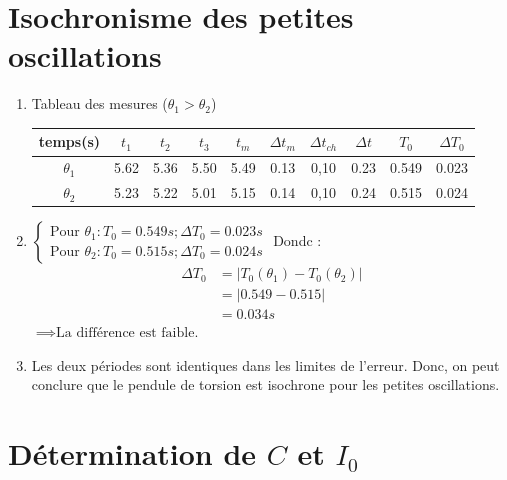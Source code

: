 \documentclass[a4paper,12pt]{article}
\begin{document}
\section{Isochronisme des petites oscillations}
\begin{enumerate}
    \item Tableau des mesures ($\theta_1 > \theta_2$) 
\begin{table}[H]
    \centering
    \renewcommand{\arraystretch}{1.5}
    \begin{tabular}{|c|c|c|c|c|c|c|c|c|c|}
    \hline
    temps(s) & $t_1$ & $t_2$ & $t_3$ & $t_m$ & $\Delta t_m$ & $\Delta t_{ch}$ & $\Delta t$ & $T_0$ & $\Delta T_0$ \\
    \hline
    $\theta_1$ & 5.62 & 5.36 & 5.50 & 5.49 & 0.13 & 0,10 & 0.23 & 0.549 & 0.023 \\
    \hline
    $\theta_2$ & 5.23 & 5.22 & 5.01 & 5.15 & 0.14 & 0,10 & 0.24 & 0.515 & 0.024 \\
    \hline
    \end{tabular}
\end{table}

    \item$ 
    \begin{cases}
        \text{Pour } \theta_1: T_0 = 0.549s ; \Delta T_0 =0.023s \\
        \text{Pour } \theta_2: T_0 = 0.515s ; \Delta T_0 =0.024s
    \end{cases}
    $
    Dondc : 
    \begin{align*}
        \Delta T_0 & = |T_0(\theta_1) - T_0(\theta_2)| \\
        & = |0.549 - 0.515| \\
        & = 0.034s
    \end{align*}
    $\implies \text{La différence est faible.}$
    \item Les deux périodes sont identiques dans les limites de l'erreur. Donc, on peut conclure que le pendule de torsion est isochrone pour les petites oscillations.

\end{enumerate}
\section{Détermination de $C$ et $I_0$}
\end{document}
